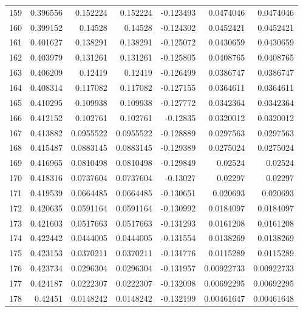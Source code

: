 \begin{tabular}{rrrrrrr}
 159 &  0.396556    & 0.152224    & 0.152224    & -0.123493    & 0.0474046   & 0.0474046   \\
 160 &  0.399152    & 0.14528     & 0.14528     & -0.124302    & 0.0452421   & 0.0452421   \\
 161 &  0.401627    & 0.138291    & 0.138291    & -0.125072    & 0.0430659   & 0.0430659   \\
 162 &  0.403979    & 0.131261    & 0.131261    & -0.125805    & 0.0408765   & 0.0408765   \\
 163 &  0.406209    & 0.12419     & 0.12419     & -0.126499    & 0.0386747   & 0.0386747   \\
 164 &  0.408314    & 0.117082    & 0.117082    & -0.127155    & 0.0364611   & 0.0364611   \\
 165 &  0.410295    & 0.109938    & 0.109938    & -0.127772    & 0.0342364   & 0.0342364   \\
 166 &  0.412152    & 0.102761    & 0.102761    & -0.12835     & 0.0320012   & 0.0320012   \\
 167 &  0.413882    & 0.0955522   & 0.0955522   & -0.128889    & 0.0297563   & 0.0297563   \\
 168 &  0.415487    & 0.0883145   & 0.0883145   & -0.129389    & 0.0275024   & 0.0275024   \\
 169 &  0.416965    & 0.0810498   & 0.0810498   & -0.129849    & 0.02524     & 0.02524     \\
 170 &  0.418316    & 0.0737604   & 0.0737604   & -0.13027     & 0.02297     & 0.02297     \\
 171 &  0.419539    & 0.0664485   & 0.0664485   & -0.130651    & 0.020693    & 0.020693    \\
 172 &  0.420635    & 0.0591164   & 0.0591164   & -0.130992    & 0.0184097   & 0.0184097   \\
 173 &  0.421603    & 0.0517663   & 0.0517663   & -0.131293    & 0.0161208   & 0.0161208   \\
 174 &  0.422442    & 0.0444005   & 0.0444005   & -0.131554    & 0.0138269   & 0.0138269   \\
 175 &  0.423153    & 0.0370211   & 0.0370211   & -0.131776    & 0.0115289   & 0.0115289   \\
 176 &  0.423734    & 0.0296304   & 0.0296304   & -0.131957    & 0.00922733  & 0.00922733  \\
 177 &  0.424187    & 0.0222307   & 0.0222307   & -0.132098    & 0.00692295  & 0.00692295  \\
 178 &  0.42451     & 0.0148242   & 0.0148242   & -0.132199    & 0.00461647  & 0.00461648  \\

\end{tabular}
